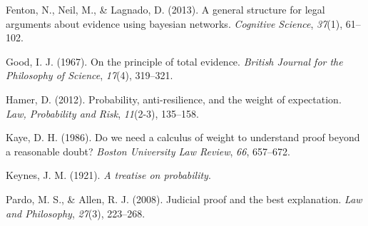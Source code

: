 \documentclass[
  10pt,
  dvipsnames,enabledeprecatedfontcommands]{scrartcl}
\newlength{\cslhangindent}
\newlength{\cslentryspacingunit} %
\newenvironment{CSLReferences}[2] %
 {%
  \setlength{\parindent}{0pt}
  \ifodd #1
  \let\oldpar\par
  \def\par{\hangindent=\cslhangindent\oldpar}
  \fi
  \setlength{\parskip}{#2\cslentryspacingunit}
 }%
 {}
\begin{document}
\hypertarget{refs}{}
\begin{CSLReferences}{1}{0}
\leavevmode{}%
Fenton, N., Neil, M., \& Lagnado, D. (2013). A general structure for
legal arguments about evidence using bayesian networks. \emph{Cognitive
Science}, \emph{37}(1), 61--102.

\leavevmode{}%
Good, I. J. (1967). On the principle of total evidence. \emph{British
Journal for the Philosophy of Science}, \emph{17}(4), 319--321.

\leavevmode{}%
Hamer, D. (2012). Probability, anti-resilience, and the weight of
expectation. \emph{Law, Probability and Risk}, \emph{11}(2-3), 135--158.

\leavevmode{}%
Kaye, D. H. (1986). Do we need a calculus of weight to understand proof
beyond a reasonable doubt? \emph{Boston University Law Review},
\emph{66}, 657--672.

\leavevmode{}%
Keynes, J. M. (1921). \emph{A treatise on probability}.

\leavevmode{}%
Pardo, M. S., \& Allen, R. J. (2008). Judicial proof and the best
explanation. \emph{Law and Philosophy}, \emph{27}(3), 223--268.

\end{CSLReferences}
\end{document}
